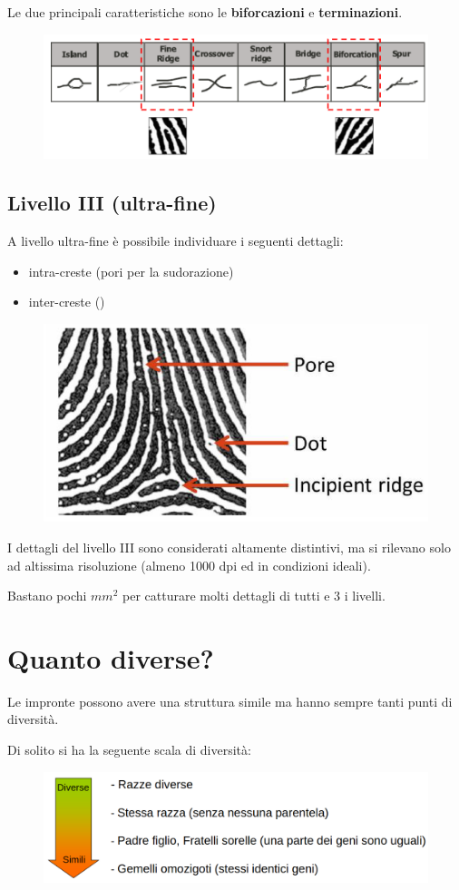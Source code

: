 \documentclass{report}
\begin{document}
\noindent Le due principali caratteristiche sono le \textbf{biforcazioni} e \textbf{terminazioni}.
\begin{figure}[ht]
    \centering
    \includegraphics[width=0.75\linewidth]{images/caratteristiche.png}
\end{figure}

\subsection{Livello III (ultra-fine)}
A livello ultra-fine è possibile individuare i seguenti dettagli:
\begin{itemize}
    \item intra-creste (pori per la sudorazione)
    \item inter-creste ()
\end{itemize}

\begin{figure}[ht]
    \centering
    \includegraphics[width=0.5\linewidth]{images/livello3.png}
\end{figure}

\noindent I dettagli del livello III sono
considerati altamente distintivi,
ma si rilevano solo ad altissima
risoluzione (almeno 1000 dpi
ed in condizioni ideali).

\noindent Bastano pochi $mm^2$ per catturare molti dettagli di tutti e 3 i livelli.

\section{Quanto diverse?}

Le impronte possono avere una struttura simile ma hanno sempre tanti
punti di diversità.

\noindent Di solito si ha la seguente scala di diversità:
\begin{figure}[ht]
    \centering
    \includegraphics[width=1\linewidth]{images/diversita.png}
\end{figure}
\end{document}
